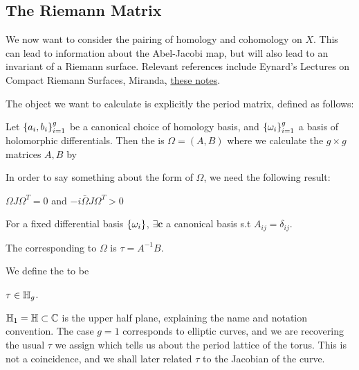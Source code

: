 \documentclass{article}
\begin{document}
\subsection{The Riemann Matrix}
We now want to consider the pairing of homology and cohomology on $X$. This can lead to information about the Abel-Jacobi map, but will also lead to an invariant of a Riemann surface. Relevant references include Eynard's Lectures on Compact Riemann Surfaces, Miranda, \href{https://people.reed.edu/~jerry/311/theta.pdf}{these notes}. 

The object we want to calculate is explicitly the period matrix, defined as follows:
\begin{definition}\label{def: period matrix}
	Let $\left\{ a_i, b_i \right\}_{i=1}^g$ be a canonical choice of homology basis, and $\left\{ \omega_i \right\}_{i=1}^g$ a basis of holomorphic differentials. Then the  is $\Omega = (A,B)$ where we calculate the $g\times g$ matrices $A,B$ by 
\end{definition}

In order to say something about the form of $\Omega$, we need the following result:
\begin{prop}
	$\Omega J \Omega^T = 0$ and $-i\bar{\Omega}J\Omega^T > 0$
\end{prop}
\begin{corollary}
	For a fixed differential basis $\left\{ \omega_i \right\}$, $\exists \bm{c}$ a canonical basis s.t $A_{ij} = \delta_{ij}$. 
\end{corollary}

\begin{definition}
	The  corresponding to $\Omega$ is $\tau = A^{-1}B$. 
\end{definition}

\begin{definition}\label{def: Siegel upper half space}
	We define the  to be 
\end{definition}

\begin{lemma} $\tau \in \mathbb{H}_g$.  
\end{lemma}

\begin{example}
	$\mathbb{H}_1 = \mathbb{H} \subset \mathbb{C}$ is the upper half plane, explaining the name and notation convention. The case $g=1$ corresponds to elliptic curves, and we are recovering the usual $\tau$ we assign which tells us about the period lattice of the torus. This is not a coincidence, and we shall later related $\tau$ to the Jacobian of the curve. 
\end{example}
\end{document}
